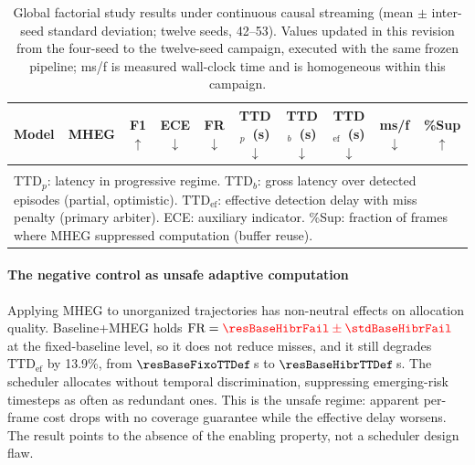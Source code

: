 \documentclass[a4paper,fleqn]{cas-dc}
\newcommand{\MHEG}{\mbox{MHEG}\xspace}
\begin{document}
\begin{table}[!tbp]
\centering
\caption{Global factorial study results under continuous causal streaming
(mean $\pm$ inter-seed standard deviation{\color{\revcolor}; twelve seeds,
42--53}). {\color{\revcolor}Values updated in this revision from the four-seed
to the twelve-seed campaign, executed with the same frozen pipeline; ms/f is
measured wall-clock time and is homogeneous within this campaign.}}
\label{tab:resultados_principais}
\footnotesize
\setlength{\tabcolsep}{4.5pt}
\renewcommand{\arraystretch}{1.22}
\begin{tabular}{l l c c c c c c c c}
\toprule
\textbf{Model} & \textbf{MHEG}
  & \textbf{F1}$\uparrow$ & \textbf{ECE}$\downarrow$
  & \textbf{FR}$\downarrow$
  & \textbf{TTD$_{p}$~(s)}$\downarrow$ & \textbf{TTD$_b$~(s)}$\downarrow$
  & \textbf{TTD$_{\mathrm{ef}}$~(s)}$\downarrow$ & \textbf{ms/f}$\downarrow$
  & \textbf{\%Sup}$\uparrow$ \\
\midrule

\\
\bottomrule
\multicolumn{10}{p{0.96\linewidth}}{\footnotesize
$\text{TTD}_{p}$: latency in progressive regime.
$\text{TTD}_b$: gross latency over detected episodes (partial, optimistic).
$\mathrm{TTD}_{\mathrm{ef}}$: effective detection delay with miss penalty (primary arbiter).
ECE: auxiliary indicator.
\%Sup: fraction of frames where MHEG suppressed computation (buffer reuse).}
\end{tabular}
\end{table}
\paragraph{The negative control as unsafe adaptive computation}
Applying \MHEG to unorganized trajectories has non-neutral effects on allocation
quality. Baseline+MHEG holds $\text{FR} = {\color{\revcolor}\resBaseHibrFail \pm \stdBaseHibrFail}$
at the fixed-baseline level, so it does not reduce misses, and it still degrades
$\mathrm{TTD}_{\mathrm{ef}}$ by {\color{\revcolor}13.9\%, from $\resBaseFixoTTDef$\,s to
$\resBaseHibrTTDef$\,s}. The scheduler allocates without temporal discrimination,
suppressing emerging-risk timesteps as often as redundant ones. This is the
unsafe regime: apparent per-frame cost drops with no coverage guarantee while
the effective delay worsens. The result points to the absence of the enabling
property, not a scheduler design flaw.
\end{document}

